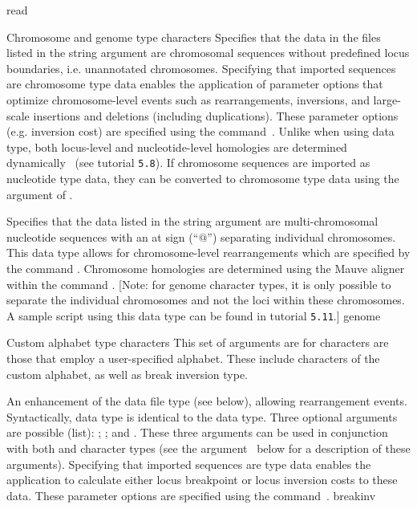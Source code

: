 \begin{command}{read}{}
\begin{arguments}
\begin{argumentgroup}{Chromosome and genome type characters}
{Specifies that the data in the files listed in the string argument
are chromosomal sequences without predefined locus boundaries, i.e. 
unannotated chromosomes.
Specifying that imported sequences are chromosome type data enables
the application of parameter options that optimize chromosome-level
events such as rearrangements, inversions, and large-scale
insertions and deletions (including duplications). These parameter
options (e.g. inversion cost) are specified using the
command~. 
Unlike when using  data type,
both locus-level and nucleotide-level homologies
are determined dynamically~\cite{darlingetal2004, vinh2007} 
(see tutorial \texttt{5.8}). If chromosome sequences are imported as
nucleotide type data, they can be converted to chromosome type data
using the  argument of
.} 
{}

{Specifies that the data listed in the string argument are
multi-chromosomal nucleotide sequences with an at sign (``$@$'') 
separating individual chromosomes. This data type
allows for chromosome-level rearrangements which are specified by
the command . Chromosome
homologies are determined using the Mauve aligner~\cite{darlingetal2004} within 	 	
the command . [Note: for genome
character types, it is only possible to separate the individual chromosomes and 
not the loci within these chromosomes. A sample script using this data type 
can be found in tutorial \texttt{5.11}.]} 
{genome}

\end{argumentgroup}


\begin{argumentgroup}{Custom alphabet type characters}
This set of arguments are for characters are those that employ a user-specified alphabet. 
These include characters of the custom alphabet, as well as break inversion type.

{An enhancement of the data file type  
(see below), allowing rearrangement events. Syntactically,  
data type is identical to the  data type. Three optional 
arguments are possible (\poylident list): ; ; 
and . These three arguments  can be used in conjunction
with both  and  character 
types (see the argument~ below for 
a description of these arguments). Specifying that imported sequences 
are  type data enables the application to calculate either 
locus breakpoint or locus inversion costs to these data. These parameter
options are specified using the command~.} 
{breakinv}


\end{argumentgroup}
\end{arguments}
\end{command}
